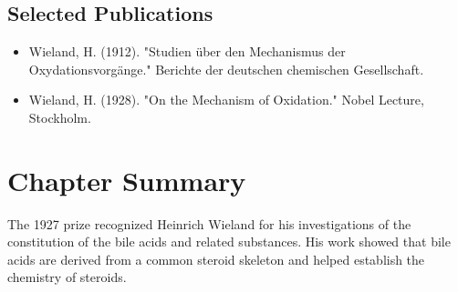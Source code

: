 \subsection*{Selected Publications}

\begin{itemize}

\item Wieland, H. (1912). "Studien über den Mechanismus der Oxydationsvorgänge." Berichte der deutschen chemischen Gesellschaft.

\item Wieland, H. (1928). "On the Mechanism of Oxidation." Nobel Lecture, Stockholm.

\end{itemize}

\clearpage

\section*{Chapter Summary}

The 1927 prize recognized Heinrich Wieland for his investigations of the constitution of the bile acids and related substances. His work showed that bile acids are derived from a common steroid skeleton and helped establish the chemistry of steroids.
